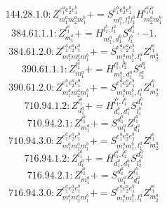 \documentclass[letterpaper,10pt,fleqn,leqno,onecolumn]{article}
\begin{document}
\begin{equation} \;\;\;\;\;\;  144.28.1.0: Z^{e_{1}^{a}e_{2}^{a}e_{1}^{b}}_{m_{1}^{a}m_{2}^{a}m_{1}^{b}}+=S^{e_{1}^{a}e_{2}^{a}e_{1}^{b}}_{m_{1}^{a},l_{1}^{a}l_{1}^{b}}H^{l_{1}^{a}l_{1}^{b}}_{m_{2}^{a}m_{1}^{b}} \end{equation}
\begin{equation} \;\;\;\;\;\;  384.61.1.1: Z^{l_{1}^{a}}_{m_{1}^{a}}+=H^{l_{1}^{b},l_{1}^{a}}_{m_{1}^{a},d_{1}^{b}}S^{d_{1}^{b}}_{l_{1}^{b}}\cdot -1. \end{equation}
\begin{equation} \;\;\;\;\;\;  384.61.2.0: Z^{e_{1}^{a}e_{2}^{a}e_{1}^{b}}_{m_{1}^{a}m_{2}^{a}m_{1}^{b}}+=S^{e_{1}^{a}e_{2}^{a}e_{1}^{b}}_{m_{1}^{a}m_{1}^{b},l_{1}^{a}}Z^{l_{1}^{a}}_{m_{2}^{a}} \end{equation}
\begin{equation} \;\;\;\;\;\;  390.61.1.1: Z^{l_{1}^{a}}_{m_{1}^{a}}+=H^{l_{1}^{a},l_{2}^{a}}_{m_{1}^{a},d_{1}^{a}}S^{d_{1}^{a}}_{l_{2}^{a}} \end{equation}
\begin{equation} \;\;\;\;\;\;  390.61.2.0: Z^{e_{1}^{a}e_{2}^{a}e_{1}^{b}}_{m_{1}^{a}m_{2}^{a}m_{1}^{b}}+=S^{e_{1}^{a}e_{2}^{a}e_{1}^{b}}_{m_{1}^{a}m_{1}^{b},l_{1}^{a}}Z^{l_{1}^{a}}_{m_{2}^{a}} \end{equation}
\begin{equation} \;\;\;\;\;\;  710.94.1.2: Z^{l_{1}^{a}}_{d_{1}^{a}}+=H^{l_{1}^{b},l_{1}^{a}}_{d_{1}^{b},d_{1}^{a}}S^{d_{1}^{b}}_{l_{1}^{b}} \end{equation}
\begin{equation} \;\;\;\;\;\;  710.94.2.1: Z^{l_{1}^{a}}_{m_{1}^{a}}+=S^{d_{1}^{a}}_{m_{1}^{a}}Z^{l_{1}^{a}}_{d_{1}^{a}} \end{equation}
\begin{equation} \;\;\;\;\;\;  710.94.3.0: Z^{e_{1}^{a}e_{2}^{a}e_{1}^{b}}_{m_{1}^{a}m_{2}^{a}m_{1}^{b}}+=S^{e_{1}^{a}e_{2}^{a}e_{1}^{b}}_{m_{1}^{a}m_{1}^{b},l_{1}^{a}}Z^{l_{1}^{a}}_{m_{2}^{a}} \end{equation}
\begin{equation} \;\;\;\;\;\;  716.94.1.2: Z^{l_{1}^{a}}_{d_{1}^{a}}+=H^{l_{1}^{a},l_{2}^{a}}_{d_{1}^{a},d_{2}^{a}}S^{d_{2}^{a}}_{l_{2}^{a}} \end{equation}
\begin{equation} \;\;\;\;\;\;  716.94.2.1: Z^{l_{1}^{a}}_{m_{1}^{a}}+=S^{d_{1}^{a}}_{m_{1}^{a}}Z^{l_{1}^{a}}_{d_{1}^{a}} \end{equation}
\begin{equation} \;\;\;\;\;\;  716.94.3.0: Z^{e_{1}^{a}e_{2}^{a}e_{1}^{b}}_{m_{1}^{a}m_{2}^{a}m_{1}^{b}}+=S^{e_{1}^{a}e_{2}^{a}e_{1}^{b}}_{m_{1}^{a}m_{1}^{b},l_{1}^{a}}Z^{l_{1}^{a}}_{m_{2}^{a}} \end{equation}
\end{document}
